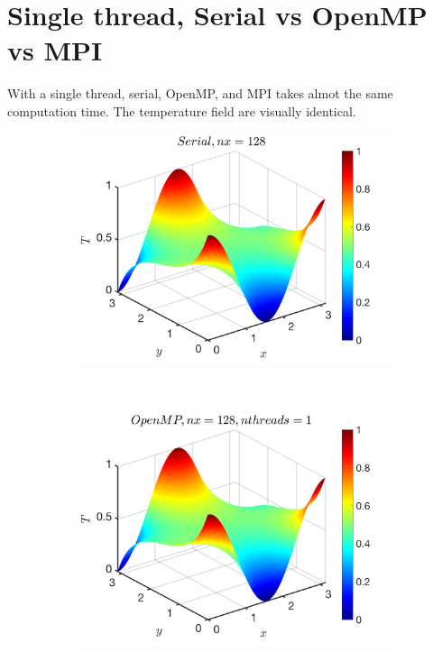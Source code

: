 \documentclass[a4paper]{article}
\begin{document}
\section{Single thread, Serial vs OpenMP vs MPI}
With a single thread, serial, OpenMP, and MPI takes almot the same computation time. The temperature field are visually identical.
      \begin{figure}[H]
        \centering
        \begin{subfigure}[b]{0.32\textwidth}   
            \centering 
            \includegraphics[width=\textwidth]{./Figure/heat_serial_nx128.png} 
        \end{subfigure}
        \
        \begin{subfigure}[b]{0.32\textwidth}   
            \centering 
            \includegraphics[width=\textwidth]{./Figure/heat_omp_nx128_nth1.png}  

\end{subfigure}
\end{figure}
\end{document}
